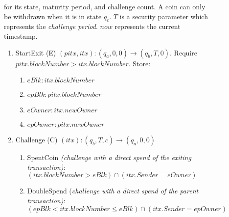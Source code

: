 \begin{figure}
\begin{minipage}{\columnwidth}
\begin{framed}
     for its state, maturity period, and challenge count. A coin can only be withdrawn when it is in state $q_c$. $T$ is a security parameter which represents the \textit{challenge period}. $now$ represents the current timestamp.



    \begin{enumerate}
        \item StartExit (E) $(pitx, itx): (q_a, 0, 0) \rightarrow (q_b, T, 0)$. Require $pitx.blockNumber> itx.blockNumber$. Store:
            \begin{enumerate}
                \item $eBlk: itx.blockNumber$
                \item $epBlk: pitx.blockNumber$
                \item $eOwner: itx.newOwner$
                \item $epOwner: pitx.newOwner$
            \end{enumerate}
        \item Challenge (C) $(itx): (q_b, T, c) \rightarrow (q_a, 0, 0)$
            \begin{enumerate}
                \item SpentCoin \textit{(challenge with a direct spend of the exiting transaction)}: $(itx.blockNumber > eBlk) \cap (itx.Sender = eOwner)$
                \item DoubleSpend (\textit{challenge with a direct spend of the parent transaction)}: $(epBlk < itx.blockNumber \leq eBlk) \cap (itx.Sender = epOwner)$ 


\end{enumerate}
\end{enumerate}
\end{framed}
\end{minipage}
\end{figure}
